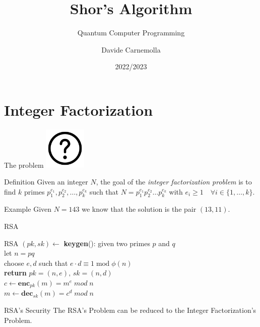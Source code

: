 \documentclass{beamer}
\title{Shor's Algorithm}
\subtitle{Quantum Computer Programming}
\author{Davide Carnemolla}
\institute{Department of Mathematics and \\ Computer Science \\ \\ University of Catania}
\date{2022/2023}
\begin{document}
    \begin{frame}
        \maketitle
    \end{frame}
    
    \section{Integer Factorization}

    \begin{frame}{The problem}
        \centering
        \includegraphics[height=2cm,keepaspectratio]{images/problem.pdf}
        \vspace{1cm}
        \begin{block}{Definition}
            Given an integer $N$, the goal of the \textit{integer factorization problem} is to find $k$ primes $p_1^{e_1},p_2^{e_2},\dots,p_k^{e_k}$ such that $N = p_1^{e_1}p_2^{e_2} \dots p_k^{e_k}$ with $e_i \geq 1 \quad \forall i \in \{1, \dots, k\}$.
        \end{block}
        \begin{exampleblock}{Example}
            Given $N = 143$ we know that the solution is the pair $(13, 11).$
        \end{exampleblock}
        
    \end{frame}

    \begin{frame}{RSA}
        \centering
        \begin{block}{RSA}
            $(pk,sk) \leftarrow$ \textbf{keygen}(): \hspace{0.05cm} given two primes $p$ and $q$ \\ 
                \hspace{3.7cm} let $n = pq$ \\ 
                \hspace{3.7cm} choose $e,d$ such that $e \cdot d \equiv 1 \; \text{mod} \; \phi(n)$ \\
                \hspace{3.7cm} \textbf{return} $pk = (n,e), \, sk = (n, d)$ \\
            \vspace{0.5cm}
            $c \leftarrow \textbf{enc}_{pk}(m) = m^e \; mod \; n$ \\
            \vspace{0.5cm}
            $m \leftarrow \textbf{dec}_{sk}(m) = c^d \; mod \; n$
        \end{block}
        \begin{alertblock}{RSA's Security}
            The RSA's Problem can be reduced to the Integer Factorization's Problem.
        \end{alertblock}
    \end{frame}
\end{document}
